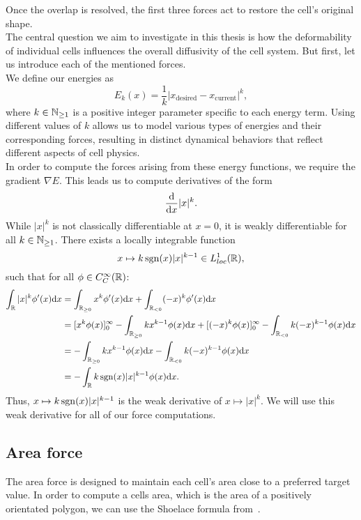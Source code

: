 Once the overlap is resolved, the first three forces act to restore the cell's original shape. \\
The central question we aim to investigate in this thesis is how the deformability of individual cells influences the overall diffusivity of the cell system.
But first, let us introduce each of the mentioned forces. \\
We define our energies as
\[E_k(x) = \frac{1}{k} |x_{\text{desired}} - x_{\text{current}}|^k, \]
where $k \in \mathbb{N}_{\geq 1}$ is a positive integer parameter specific to each energy term. 
Using different values of $k$ allows us to model various types of energies and their corresponding forces, resulting in distinct dynamical behaviors that reflect different aspects of cell physics. \\
In order to compute the forces arising from these energy functions, we require the gradient $\nabla E$. 
This leads us to compute derivatives of the form 
\[ \frac{\mathrm{d}}{\mathrm{d} x} |x|^k. \]
While $|x|^k$ is not classically differentiable at $x=0$, it is weakly differentiable for all $k \in \mathbb{N}_{\geq 1}$.
There exists a locally integrable function 
\[ x \mapsto k \operatorname{sgn}(x)|x|^{k-1} \in L^1_{loc}(\mathbb{R}),\] 
such that for all $\phi \in C_C^{\infty}(\mathbb{R})$:
\begin{align*}
	\int_{\mathbb{R}} |x|^k \phi'(x) \mathrm{d} x  
	&= \int_{\mathbb{R}_{\geq 0}} x^k \phi'(x) \mathrm{d} x + \int_{\mathbb{R}_{< 0}} (-x)^k \phi'(x) \mathrm{d} x \\
	&= [x^k \phi(x)]_{0}^{\infty} - \int_{\mathbb{R}_{\geq 0}} k x^{k-1} \phi(x) \mathrm{d} x + [(-x)^k \phi(x)]_{0}^{\infty} - \int_{\mathbb{R}_{< 0}} k (-x)^{k-1} \phi(x) \mathrm{d} x \\
	&= - \int_{\mathbb{R}_{\geq 0}} k x^{k-1} \phi(x) \mathrm{d} x - \int_{\mathbb{R}_{< 0}} k (-x)^{k-1} \phi(x) \mathrm{d} x \\
	&= - \int_{\mathbb{R}} k \operatorname{sgn}(x)|x|^{k-1} \phi(x) \mathrm{d} x.
\end{align*}
Thus, $x \mapsto k \operatorname{sgn}(x)|x|^{k-1}$ is the weak derivative of $x \mapsto |x|^k$. 
We will use this weak derivative for all of our force computations. 

\subsection{Area force}
The area force is designed to maintain each cell's area close to a preferred target value. 
In order to compute a cells area, which is the area of a positively orientated polygon, we can use the Shoelace formula from~\cite{Shoelace2014}. 

